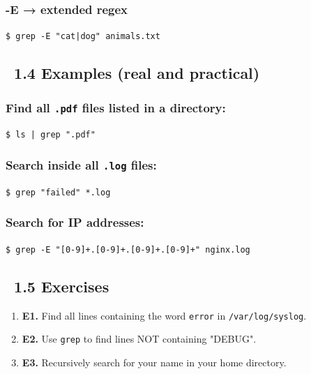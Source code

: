 \documentclass[12pt]{article}
\newcommand{\fireicon}{\faFire}
\newcommand{\exerciseicon}{\faTasks}
\begin{document}
\subsubsection*{\textbf{-E} → extended regex}

\begin{highlightbox}
\texttt{\$ grep -E "cat|dog" animals.txt}
\end{highlightbox}

\subsection*{\fireicon\ 1.4 Examples (real and practical)}

\subsubsection*{Find all \texttt{.pdf} files listed in a directory:}

\begin{highlightbox}
\texttt{\$ ls | grep ".pdf"}
\end{highlightbox}

\subsubsection*{Search inside all \texttt{.log} files:}

\begin{highlightbox}
\texttt{\$ grep "failed" *.log}
\end{highlightbox}

\subsubsection*{Search for IP addresses:}

\begin{highlightbox}
\texttt{\$ grep -E "[0-9]+.[0-9]+.[0-9]+.[0-9]+" nginx.log}
\end{highlightbox}

\subsection*{\exerciseicon\ 1.5 Exercises}

\begin{enumerate}
    \item \textbf{E1.} Find all lines containing the word \texttt{error} in \texttt{/var/log/syslog}.
    
    \item \textbf{E2.} Use \texttt{grep} to find lines NOT containing "DEBUG".
    
    \item \textbf{E3.} Recursively search for your name in your home directory.
\end{enumerate}
\end{document}
